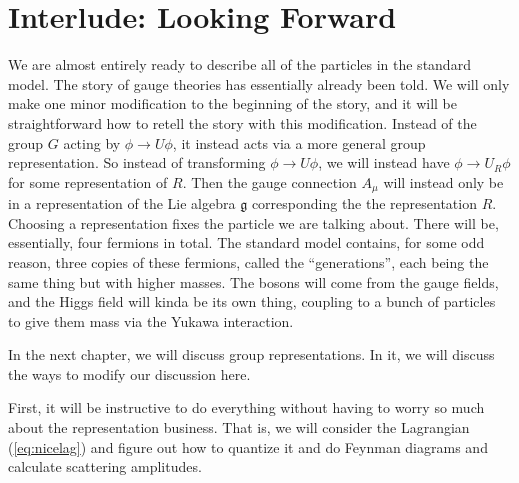 \documentclass[main.tex]{subfiles}
\begin{document}
\section{Interlude: Looking Forward}
We are almost entirely ready to describe all of the particles in the standard model. The story of gauge theories has essentially already been told. We will only make one minor modification to the beginning of the story, and it will be straightforward how to retell the story with this modification. Instead of the group $G$ acting by $\phi \to U \phi$, it instead acts via a more general group representation. So instead of transforming $\phi \to U \phi$, we will instead have $\phi \to U_R \phi$ for some representation of $R$. Then the gauge connection $A_\mu$ will instead only be in a representation of the Lie algebra $\mathfrak{g}$ corresponding the the representation $R$. Choosing a representation fixes the particle we are talking about. There will be, essentially, four fermions in total. The standard model contains, for some odd reason, three copies of these fermions, called the ``generations'', each being the same thing but with higher masses. The bosons will come from the gauge fields, and the Higgs field will kinda be its own thing, coupling to a bunch of particles to give them mass via the Yukawa interaction. 

In the next chapter, we will discuss group representations. In it, we will discuss the ways to modify our discussion here.

First, it will be instructive to do everything without having to worry so much about the representation business. That is, we will consider the Lagrangian (\ref{eq:nicelag}) and figure out how to quantize it and do Feynman diagrams and calculate scattering amplitudes.

\newpage
\end{document}
